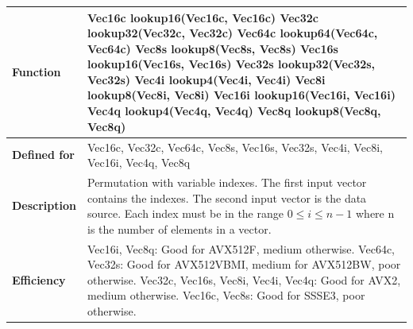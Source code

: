 \documentclass[vcl_manual.tex]{subfiles}
\begin{document}
\begin{tabular}{|p{30mm}|p{120mm}|}
\hline
\bfseries Function & Vec16c lookup16(Vec16c, Vec16c) \newline
Vec32c lookup32(Vec32c, Vec32c) \newline
Vec64c lookup64(Vec64c, Vec64c) \newline
Vec8s lookup8(Vec8s, Vec8s) \newline
Vec16s lookup16(Vec16s, Vec16s) \newline
Vec32s lookup32(Vec32s, Vec32s) \newline
Vec4i lookup4(Vec4i, Vec4i) \newline
Vec8i lookup8(Vec8i, Vec8i) \newline
Vec16i lookup16(Vec16i, Vec16i) \newline
Vec4q lookup4(Vec4q, Vec4q) \newline
Vec8q lookup8(Vec8q, Vec8q) \\ \hline
\bfseries Defined for & Vec16c, Vec32c, Vec64c, Vec8s, Vec16s, Vec32s, Vec4i, Vec8i, Vec16i, Vec4q, Vec8q \\ \hline
\bfseries Description & Permutation with variable indexes. The first input vector contains the indexes. The second input vector is the data source. Each index must be in the range  $0 \leq i \leq n-1$ where n is the number of elements in a vector. \\ \hline
\bfseries Efficiency & 
Vec16i, Vec8q: Good for AVX512F, medium otherwise.  \newline
Vec64c, Vec32s: Good for AVX512VBMI, medium for AVX512BW, poor otherwise. \newline
Vec32c, Vec16s, Vec8i, Vec4i, Vec4q: Good for AVX2, medium otherwise. \newline
Vec16c, Vec8s: Good for SSSE3, poor otherwise. \\ \hline
\end{tabular}
\end{document}
